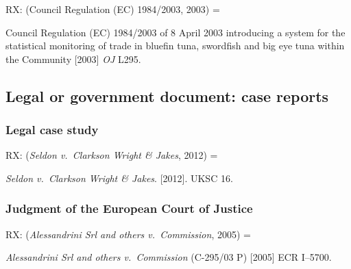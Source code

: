 RX: (Council Regulation (EC) 1984/2003, 2003) = \cite{eu.dir1984/2003}

Council Regulation (EC) 1984/2003 of 8 April 2003 introducing a system for the statistical monitoring of trade in bluefin tuna, swordfish and big eye tuna within the Community [2003] \emph{OJ} L295.



\subsection{Legal or government document: case reports}

\subsubsection*{Legal case study}

RX: (\emph{Seldon v.~Clarkson Wright \& Jakes}, 2012) = \cite{seldon-v-c.w.j2012}

\emph{Seldon v.~Clarkson Wright \& Jakes}. [2012]. UKSC 16.



\subsubsection*{Judgment of the European Court of Justice}

RX: (\emph{Alessandrini Srl and others v.~Commission}, 2005) = \cite{srl.etal-v-comm2005}

\emph{Alessandrini Srl and others v.~Commission} (C-295/03 P) [2005] ECR I--5700.


